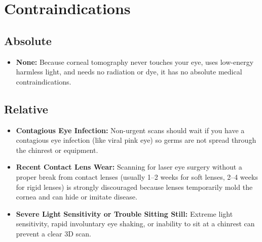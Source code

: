\section{Contraindications}

\subsection{Absolute}
\begin{itemize}
    \item \textbf{None:} Because corneal tomography never touches your eye, uses low-energy harmless light, and needs no radiation or dye, it has no absolute medical contraindications.
\end{itemize}

\subsection{Relative}
\begin{itemize}
    \item \textbf{Contagious Eye Infection:} Non-urgent scans should wait if you have a contagious eye infection (like viral pink eye) so germs are not spread through the chinrest or equipment.
    \item \textbf{Recent Contact Lens Wear:} Scanning for laser eye surgery without a proper break from contact lenses (usually 1--2 weeks for soft lenses, 2--4 weeks for rigid lenses) is strongly discouraged because lenses temporarily mold the cornea and can hide or imitate disease.
    \item \textbf{Severe Light Sensitivity or Trouble Sitting Still:} Extreme light sensitivity, rapid involuntary eye shaking, or inability to sit at a chinrest can prevent a clear 3D scan.
\end{itemize}


